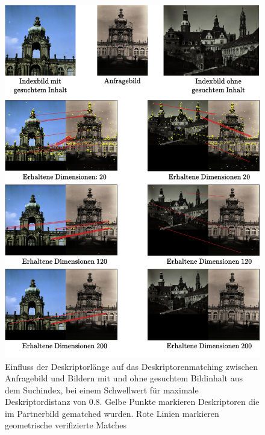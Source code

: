 \begin{figure}[H]
\centering
\includegraphics[scale=0.86]{influence_dim}
\caption{Einfluss der Deskriptorlänge auf das Deskriptorenmatching zwischen Anfragebild und Bildern mit und ohne gesuchtem Bildinhalt aus dem Suchindex, bei einem Schwellwert für maximale Deskriptordistanz von $0.8$. Gelbe Punkte markieren Deskriptoren die im Partnerbild gematched wurden. Rote Linien markieren geometrische verifizierte Matches}
\label{influence_dim}
\end{figure}

